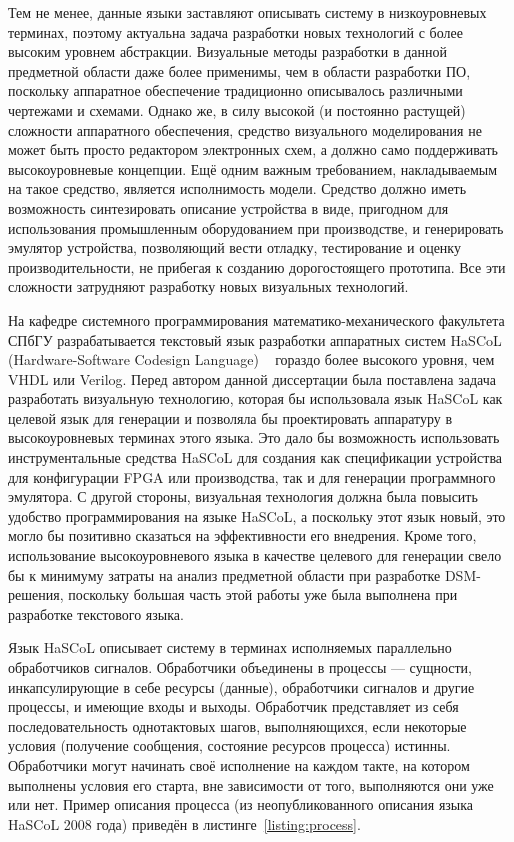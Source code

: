 Тем не менее, данные языки заставляют описывать систему в низкоуровневых терминах, 
поэтому актуальна задача разработки новых технологий с более высоким уровнем абстракции. 
Визуальные методы разработки в данной предметной области даже более применимы, чем 
в области разработки ПО, поскольку аппаратное обеспечение традиционно описывалось 
различными чертежами и схемами. Однако же, в силу высокой (и постоянно растущей) сложности 
аппаратного обеспечения, средство визуального моделирования не может быть просто редактором 
электронных схем, а должно само поддерживать высокоуровневые концепции. Ещё одним 
важным требованием, накладываемым на такое средство, является исполнимость модели. 
Средство должно иметь возможность синтезировать описание устройства в виде, пригодном 
для использования промышленным оборудованием при производстве, и генерировать эмулятор 
устройства, позволяющий вести отладку, тестирование и оценку производительности, не 
прибегая к созданию дорогостоящего прототипа. Все эти сложности затрудняют разработку 
новых визуальных технологий.

На кафедре системного программирования математико-механического факультета СПбГУ разрабатывается 
текстовый язык разработки аппаратных систем HaSCoL (Hardware-Software Codesign Language)%
~\cite{boulytchev2010hardware} гораздо более высокого уровня, чем VHDL или Verilog. Перед автором данной диссертации 
была поставлена задача разработать визуальную технологию, которая бы использовала 
язык HaSCoL как целевой язык для генерации и позволяла бы проектировать аппаратуру 
в высокоуровневых терминах этого языка. Это дало бы возможность использовать инструментальные 
средства HaSCoL для создания как спецификации устройства для конфигурации \ac{FPGA}
или производства, так и для генерации программного эмулятора. С другой стороны, визуальная 
технология должна была повысить удобство программирования на языке HaSCoL, а поскольку 
этот язык новый, это могло бы позитивно сказаться на эффективности его внедрения. 
Кроме того, использование высокоуровневого языка в качестве целевого для генерации 
свело бы к минимуму затраты на анализ предметной области при разработке \ac{DSM}-решения, 
поскольку большая часть этой работы уже была выполнена при разработке текстового языка.

Язык HaSCoL описывает систему  в терминах исполняемых параллельно обработчиков сигналов.
Обработчики объединены в процессы --- сущности, инкапсулирующие в себе ресурсы (данные), 
обработчики сигналов и другие процессы, и имеющие входы и выходы. Обработчик представляет 
из себя последовательность однотактовых шагов, выполняющихся, если некоторые условия 
(получение сообщения, состояние ресурсов процесса) истинны. Обработчики могут начинать 
своё исполнение на каждом такте, на котором выполнены условия его старта, вне зависимости 
от того, выполняются они уже или нет. Пример описания процесса (из неопубликованного
описания языка HaSCoL 2008 года) приведён в листинге~\ref{listing:process}.

